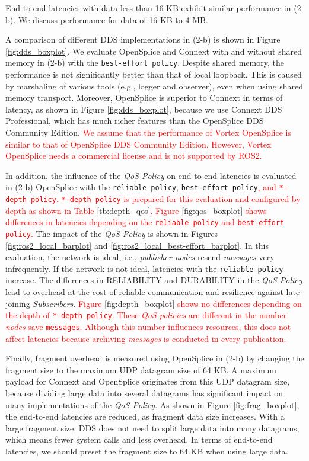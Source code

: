 \documentclass{sig-alternate-05-2015}
\begin{document}
End-to-end latencies with data less than 16 KB exhibit similar performance in (2-b).
We discuss performance for data of 16 KB to 4 MB.

A comparison of different DDS implementations in (2-b) is shown in Figure \ref{fig:dds_boxplot}.
We evaluate OpenSplice and Connext with and without shared memory in (2-b) with the \texttt{best-effort policy}.
Despite shared memory, the performance is not significantly better than that of local loopback. 
This is caused by marshaling of various tools (e.g., logger and observer), even when using shared memory transport.
Moreover, OpenSplice is superior to Connext in terms of latency, as shown in Figure \ref{fig:dds_boxplot}, because we use Connext DDS Professional, which has much richer features than the OpenSplice DDS Community Edition.
\textcolor{red}{We assume that the performance of Vortex OpenSplice is similar to that of OpenSplice DDS Community Edition.
However, Vortex OpenSplice needs a commercial license and is not supported by ROS2.}

In addition, the influence of the \emph{QoS Policy} on end-to-end latencies is evaluated in (2-b) OpenSplice with the \texttt{reliable policy}, \texttt{best-effort policy}\textcolor{red}{, and \texttt{*-depth policy}.
\texttt{*-depth policy} is prepared for this evaluation and configured by depth as shown in Table \ref{tb:depth_qos}.
Figure \ref{fig:qos_boxplot} shows differences in latencies depending on the \texttt{reliable policy} and \texttt{best-effort policy}.}
The impact of the \emph{QoS Policy} is shown in Figures \ref{fig:ros2_local_barplot} and \ref{fig:ros2_local_best-effort_barplot}.
In this evaluation, the network is ideal, i.e., \emph{publisher-nodes} resend \emph{messages} very infrequently.
If the network is not ideal, latencies with the \texttt{reliable policy} increase.
The differences in RELIABILITY and DURABILITY in the \emph{QoS Policy} lead to overhead at the cost of reliable communication and resilience against late-joining \emph{Subscribers}.
\textcolor{red}{Figure \ref{fig:depth_boxplot} shows no differences depending on the depth of \texttt{*-depth policy}.
These \emph{QoS policies} are different in the number \emph{nodes} save \texttt{messages}.
Although this number influences resources, this does not affect latencies because archiving \emph{messages} is conducted in every publication.}

Finally, fragment overhead is measured using OpenSplice in (2-b) by changing the fragment size to the maximum UDP datagram size of 64 KB. 
A maximum payload for Connext and OpenSplice originates from this UDP datagram size, because dividing large data into several datagrams has significant impact on many implementations of the \emph{QoS Policy}.
As shown in Figure \ref{fig:frag_boxplot}, the end-to-end latencies are reduced, as fragment data size increases.
With a large fragment size, DDS does not need to split large data into many datagrams, which means fewer system calls and less overhead.
In terms of end-to-end latencies, we should preset the fragment size to 64 KB when using large data.
\end{document}
